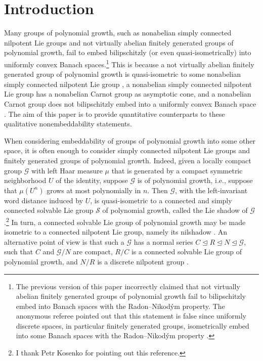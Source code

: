 \documentclass[11pt,reqno]{amsart}
\newcommand{\1}{\mathbf 1}
\begin{document}
\tableofcontents


\section{Introduction}

Many groups of polynomial growth, such as nonabelian simply connected nilpotent Lie groups and not virtually abelian finitely generated groups of polynomial growth, fail to embed bilipschitzly (or even quasi-isometrically) into uniformly convex Banach spaces.\footnote{The previous version of this paper incorrectly claimed that not virtually abelian finitely generated groups of polynomial growth fail to bilipschitzly embed into Banach spaces with the Radon--Nikod\'ym property. The anonymous referee pointed out that this statement is false since uniformly discrete spaces, in particular finitely generated groups, isometrically embed into some Banach spaces with the Radon--Nikod\'ym property \cite[Proposition 4.4]{kalton2004spaces}.} This is because a not virtually abelian finitely generated group of polynomial growth is quasi-isometric to some nonabelian simply connected nilpotent Lie group \cite{gromov1981groups,malcev1949class}, a nonabelian simply connected nilpotent Lie group has a nonabelian Carnot group as asymptotic cone, and a nonabelian Carnot group does not bilipschitzly embed into a uniformly convex Banach space \cite{cheeger2006differentiability,lee2006lp}. The aim of this paper is to provide quantitative counterparts to these qualitative nonembeddability statements.

When considering embeddability of groups of polynomial growth into some other space, it is often enough to consider simply connected nilpotent Lie groups and finitely generated groups of polynomial growth. Indeed, given a locally compact group $\mathcal{G}$ with left Haar measure $\mu$ that is generated by a compact symmetric neighborhood $U$ of the identity, suppose $\mathcal{G}$ is of polynomial growth, i.e., suppose that $\mu\left(U^n\right)$ grows at most polynomially in $n$. Then $\mathcal{G}$, with the left-invariant word distance induced by $U$, is quasi-isometric to a connected and simply connected solvable Lie group $\mathcal{S}$ of polynomial growth, called the Lie shadow of $\mathcal{G}$
 \cite[Theorem 1.2, Proposition 1.3]{breuillard2014geometry}.\footnote{I thank Petr Kosenko for pointing out this reference.} In turn, a connected solvable Lie group of polynomial growth may be made isometric to a connected nilpotent Lie group, namely its nilshadow \cite[Corollary 98]{cowling2024homogeneous}. An alternative point of view is that such a $\mathcal{G}$ has a normal series $C\trianglelefteq R\trianglelefteq N\trianglelefteq \mathcal{G}$, such that $C$ and $\mathcal{G}/N$ are compact, $R/C$ is a connected solvable Lie group of polynomial growth, and $N/R$ is a discrete nilpotent group \cite[Corollary]{losert1987structure}.
\end{document}
